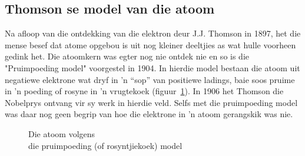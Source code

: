       \label{m38756*uid1}
            \subsection*{Thomson se model van die atoom}
            \nopagebreak
\begin{minipage}{.5\textwidth}
        \label{m38756*id254616}
Na afloop van die ontdekking van die elektron deur J.J. Thomson in 1897, het die mense besef dat atome opgebou is uit nog kleiner deeltjies as wat hulle voorheen gedink het. Die atoomkern was egter nog nie ontdek nie en so is die "Pruimpoeding model" voorgestel in 1904. In hierdie model bestaan die atoom uit negatiewe elektrone wat dryf in  'n “sop” van positiewe ladings, baie soos pruime in 'n poeding of rosyne in 'n vrugtekoek (figuur~\ref{fig:atom:plumpudding}). In 1906 het Thomson die Nobelprys ontvang vir sy werk in hierdie veld. Selfs met die pruimpoeding model was daar nog geen begrip van hoe die elektrone in  'n atoom gerangskik was nie.\\ 
\end{minipage}
\begin{minipage}{.5\textwidth}
	\begin{figure}[H] %
    \begin{center}
\begin{minipage}{.8\textwidth}
\caption{Die atoom volgens \\ die pruimpoeding (of rosyntjiekoek) model}
\end{minipage}
\label{fig:atom:plumpudding}
\end{center}
 \end{figure}    
\end{minipage}   
      

